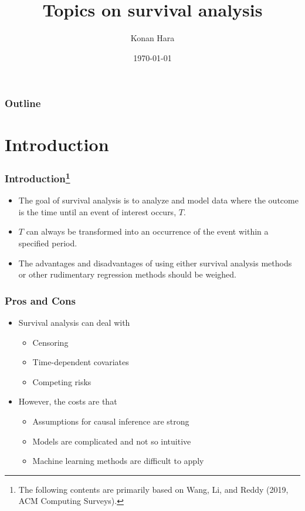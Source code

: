 \documentclass[aspectratio=169, 12pt]{beamer}
\title[Survival analysis]{Topics on survival analysis}
\author[Konan Hara]{Konan Hara}
\institute[Arizona]{University of Arizona}
\date{\today}
\begin{document}
	\begin{frame}[plain]
	\titlepage
	\end{frame}

	\begin{frame}
	\frametitle{Outline}
	\tableofcontents
	\end{frame}

	\AtBeginSection[]
	{
	   \begin{frame}
	       \frametitle{Outline}
	       \tableofcontents[currentsection]
	   \end{frame}
	}

	\section{Introduction}

	\begin{frame}
	\frametitle{Introduction\footnote{The following contents are primarily based on Wang, Li, and Reddy (2019, ACM Computing Surveys).}}
	\begin{itemize}
	\item The goal of survival analysis is to analyze and model data where the outcome is the time until an event of interest occurs, $T$.
	\item $T$ can always be transformed into an occurrence of the event within a specified period.
	\item The advantages and disadvantages of using either survival analysis methods or other rudimentary regression methods should be weighed.

	\end{itemize}
	\end{frame}

	\begin{frame}
	\frametitle{Pros and Cons}
	\begin{itemize}
	\item Survival analysis can deal with
	\begin{itemize}
	\item Censoring
	\item Time-dependent covariates
	\item Competing risks

	\end{itemize}
	\item However, the costs are that
	\begin{itemize}
	\item Assumptions for causal inference are strong
	\item Models are complicated and not so intuitive
	\item Machine learning methods are difficult to apply

	\end{itemize}
	\end{itemize}
	
	\end{frame}
\end{document}
